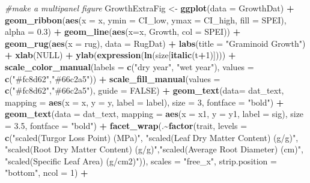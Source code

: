 \documentclass[
]{article}
\newenvironment{Shaded}{\begin{snugshade}}{\end{snugshade}}
\newcommand{\CommentTok}[1]{\textcolor[rgb]{0.56,0.35,0.01}{\textit{#1}}}
\newcommand{\DataTypeTok}[1]{\textcolor[rgb]{0.13,0.29,0.53}{#1}}
\newcommand{\DecValTok}[1]{\textcolor[rgb]{0.00,0.00,0.81}{#1}}
\newcommand{\FloatTok}[1]{\textcolor[rgb]{0.00,0.00,0.81}{#1}}
\newcommand{\KeywordTok}[1]{\textcolor[rgb]{0.13,0.29,0.53}{\textbf{#1}}}
\newcommand{\NormalTok}[1]{#1}
\newcommand{\OperatorTok}[1]{\textcolor[rgb]{0.81,0.36,0.00}{\textbf{#1}}}
\newcommand{\OtherTok}[1]{\textcolor[rgb]{0.56,0.35,0.01}{#1}}
\newcommand{\StringTok}[1]{\textcolor[rgb]{0.31,0.60,0.02}{#1}}
\begin{document}
\begin{Shaded}
\begin{Highlighting}[]
\CommentTok{\#make a multipanel figure}
\NormalTok{GrowthExtraFig \textless{}{-}}\StringTok{ }\KeywordTok{ggplot}\NormalTok{(}\DataTypeTok{data =}\NormalTok{ GrowthDat) }\OperatorTok{+}
\StringTok{  }\KeywordTok{geom\_ribbon}\NormalTok{(}\KeywordTok{aes}\NormalTok{(}\DataTypeTok{x =}\NormalTok{ x, }\DataTypeTok{ymin =}\NormalTok{ CI\_low, }\DataTypeTok{ymax =}\NormalTok{ CI\_high, }\DataTypeTok{fill =}\NormalTok{ SPEI), }\DataTypeTok{alpha =} \FloatTok{0.3}\NormalTok{) }\OperatorTok{+}
\StringTok{  }\KeywordTok{geom\_line}\NormalTok{(}\KeywordTok{aes}\NormalTok{(}\DataTypeTok{x=}\NormalTok{x, Growth, }\DataTypeTok{col =}\NormalTok{ SPEI))  }\OperatorTok{+}\StringTok{ }
\StringTok{  }\KeywordTok{geom\_rug}\NormalTok{(}\KeywordTok{aes}\NormalTok{(}\DataTypeTok{x =}\NormalTok{ rug), }\DataTypeTok{data =}\NormalTok{ RugDat) }\OperatorTok{+}
\StringTok{  }\KeywordTok{labs}\NormalTok{(}\DataTypeTok{title =} \StringTok{"Graminoid Growth"}\NormalTok{) }\OperatorTok{+}
\StringTok{  }\KeywordTok{xlab}\NormalTok{(}\OtherTok{NULL}\NormalTok{) }\OperatorTok{+}
\StringTok{  }\KeywordTok{ylab}\NormalTok{(}\KeywordTok{expression}\NormalTok{(}\KeywordTok{ln}\NormalTok{(size[}\KeywordTok{italic}\NormalTok{(t}\OperatorTok{+}\DecValTok{1}\NormalTok{)]))) }\OperatorTok{+}
\StringTok{  }\KeywordTok{scale\_color\_manual}\NormalTok{(}\DataTypeTok{labels =} \KeywordTok{c}\NormalTok{(}\StringTok{"dry year"}\NormalTok{, }\StringTok{"wet year"}\NormalTok{), }\DataTypeTok{values =} \KeywordTok{c}\NormalTok{(}\StringTok{"\#fc8d62"}\NormalTok{,}\StringTok{"\#66c2a5"}\NormalTok{)) }\OperatorTok{+}
\StringTok{  }\KeywordTok{scale\_fill\_manual}\NormalTok{(}\DataTypeTok{values =} \KeywordTok{c}\NormalTok{(}\StringTok{"\#fc8d62"}\NormalTok{,}\StringTok{"\#66c2a5"}\NormalTok{), }\DataTypeTok{guide =} \OtherTok{FALSE}\NormalTok{) }\OperatorTok{+}
\StringTok{  }\KeywordTok{geom\_text}\NormalTok{(}\DataTypeTok{data=}\NormalTok{ dat\_text, }\DataTypeTok{mapping =} \KeywordTok{aes}\NormalTok{(}\DataTypeTok{x =}\NormalTok{ x, }\DataTypeTok{y =}\NormalTok{ y, }\DataTypeTok{label =}\NormalTok{ label), }\DataTypeTok{size =} \DecValTok{3}\NormalTok{, }\DataTypeTok{fontface =} \StringTok{"bold"}\NormalTok{) }\OperatorTok{+}
\StringTok{  }\KeywordTok{geom\_text}\NormalTok{(}\DataTypeTok{data =}\NormalTok{ dat\_text, }\DataTypeTok{mapping =} \KeywordTok{aes}\NormalTok{(}\DataTypeTok{x =}\NormalTok{ x1, }\DataTypeTok{y =}\NormalTok{ y1, }\DataTypeTok{label =}\NormalTok{ sig), }\DataTypeTok{size =} \FloatTok{3.5}\NormalTok{, }\DataTypeTok{fontface =} \StringTok{"bold"}\NormalTok{) }\OperatorTok{+}
\StringTok{  }\KeywordTok{facet\_wrap}\NormalTok{(.}\OperatorTok{\textasciitilde{}}\KeywordTok{factor}\NormalTok{(trait, }\DataTypeTok{levels =} \KeywordTok{c}\NormalTok{(}\StringTok{"scaled(Turgor Loss Point) (MPa)"}\NormalTok{, }\StringTok{"scaled(Leaf Dry Matter Content) (g/g)"}\NormalTok{, }\StringTok{"scaled(Root Dry Matter Content) (g/g)"}\NormalTok{,}\StringTok{"scaled(Average Root Diameter) (cm)"}\NormalTok{, }\StringTok{"scaled(Specific Leaf Area) (g/cm2)"}\NormalTok{)), }\DataTypeTok{scales =} \StringTok{"free\_x"}\NormalTok{, }\DataTypeTok{strip.position =}  \StringTok{"bottom"}\NormalTok{, }\DataTypeTok{ncol =} \DecValTok{1}\NormalTok{) }\OperatorTok{+}

\end{Highlighting}
\end{Shaded}
\end{document}
